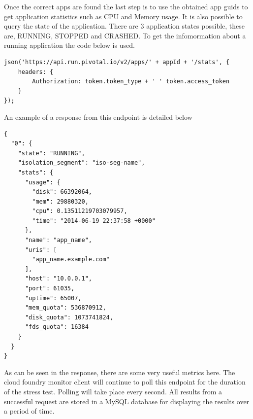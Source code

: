 Once the correct apps are found the last step is to use the obtained app guids to get application statistics such as CPU and Memory usage. It is also possible to query the state of the application. There are 3 application states possible, these are, RUNNING, STOPPED and CRASHED. To get the infomormation about a running application the code below is used. 

\begin{verbatim}
json('https://api.run.pivotal.io/v2/apps/' + appId + '/stats', {
    headers: {
        Authorization: token.token_type + ' ' token.access_token
    }
});
\end{verbatim}

An example of a response from this endpoint is detailed below

\begin{verbatim}
{
  "0": {
    "state": "RUNNING",
    "isolation_segment": "iso-seg-name",
    "stats": {
      "usage": {
        "disk": 66392064,
        "mem": 29880320,
        "cpu": 0.13511219703079957,
        "time": "2014-06-19 22:37:58 +0000"
      },
      "name": "app_name",
      "uris": [
        "app_name.example.com"
      ],
      "host": "10.0.0.1",
      "port": 61035,
      "uptime": 65007,
      "mem_quota": 536870912,
      "disk_quota": 1073741824,
      "fds_quota": 16384
    }
  }
}
\end{verbatim}

As can be seen in the response, there are some very useful metrics here. The cloud foundry monitor client will continue to poll this endpoint for the duration of the stress test. Polling will take place every second. All results from a successful request are stored in a MySQL database for displaying the results over a period of time.

